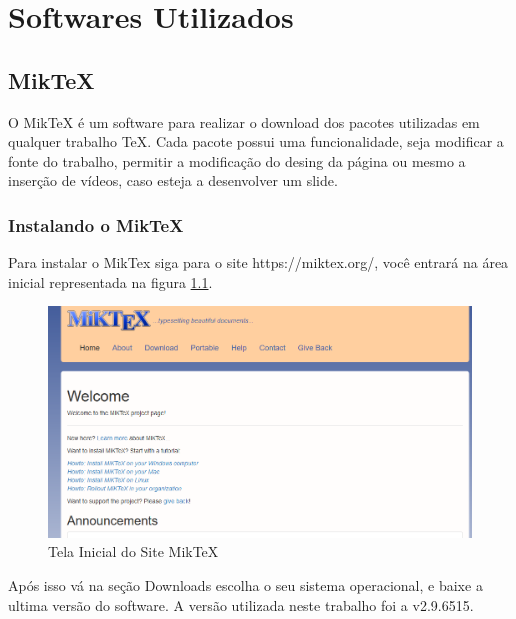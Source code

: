 
\chapter{Softwares Utilizados}

\section{MikTeX}
O MikTeX é um software para realizar o download dos pacotes utilizadas em qualquer trabalho \TeX. Cada pacote possui uma funcionalidade, seja modificar a fonte do trabalho, permitir a modificação do desing da página ou mesmo a inserção de vídeos, caso esteja a desenvolver um slide.
\subsection{Instalando o MikTeX}
Para instalar o MikTex siga para o site https://miktex.org/, você entrará na área inicial representada na figura \ref{fig_Cap1_siteMikTex}.

\begin{figure}[htb]			
	
	\caption{Tela Inicial do Site MikTeX \label{fig_Cap1_siteMikTex}}
	\begin{center}
		\includegraphics[scale=0.4]{./Imagens/Capitulo_1/siteMikTeX.png}
	\end{center}
\end{figure}

Após isso vá na seção Downloads escolha o seu sistema operacional, e baixe a ultima versão do software. A versão utilizada neste trabalho foi a v2.9.6515. 

\newpage

